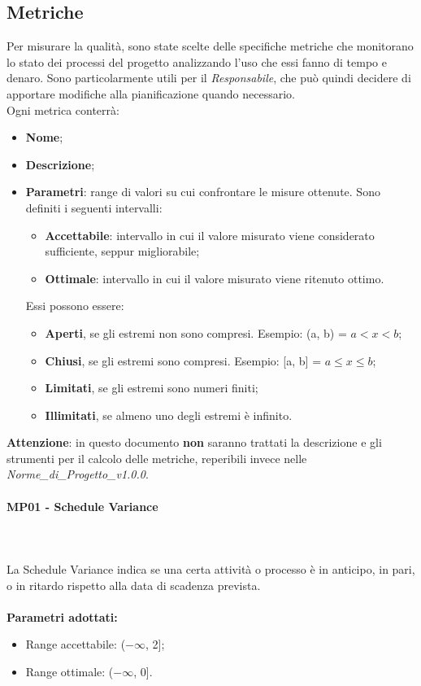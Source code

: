 \subsection{Metriche}
Per misurare la qualità, sono state scelte delle specifiche metriche che monitorano lo stato dei processi del progetto analizzando l’uso che essi fanno di tempo e denaro. Sono particolarmente utili per il \textit{Responsabile}, che può quindi decidere di apportare modifiche alla pianificazione quando necessario.\\
Ogni metrica conterrà:
\begin{itemize}
\item \textbf{Nome};
\item \textbf{Descrizione};
\item \textbf{Parametri}: range di valori su cui confrontare le misure ottenute. Sono definiti i seguenti intervalli: \begin{itemize}
\item \textbf{Accettabile}: intervallo in cui il valore misurato viene considerato sufficiente, seppur migliorabile;
\item \textbf{Ottimale}: intervallo in cui il valore misurato viene ritenuto ottimo.
\end{itemize}
Essi possono essere: \begin{itemize}
\item \textbf{Aperti}, se gli estremi non sono compresi. Esempio: (a, b) = $a < x < b$; 
\item \textbf{Chiusi}, se gli estremi sono compresi. Esempio: [a, b] = $a \leq x \leq b$;
\item \textbf{Limitati}, se gli estremi sono numeri finiti;
\item \textbf{Illimitati}, se almeno uno degli estremi è infinito.
\end{itemize}
\end{itemize}
\textbf{Attenzione}: in questo documento \textbf{non} saranno trattati la descrizione e gli strumenti per il calcolo delle metriche, reperibili invece nelle \textit{Norme\_di\_Progetto\_v1.0.0}.

\paragraph{MP01 - Schedule Variance} \mbox{} \\ \mbox{} \\
La Schedule Variance indica se una certa attività o processo è in anticipo, in pari, o in ritardo rispetto alla data di scadenza prevista. \\ \\ 
\textbf{Parametri adottati:} 
\begin{itemize}
\item Range accettabile: ($ -\infty $, 2];
\item Range ottimale: ($ -\infty $, 0].
\end{itemize}

